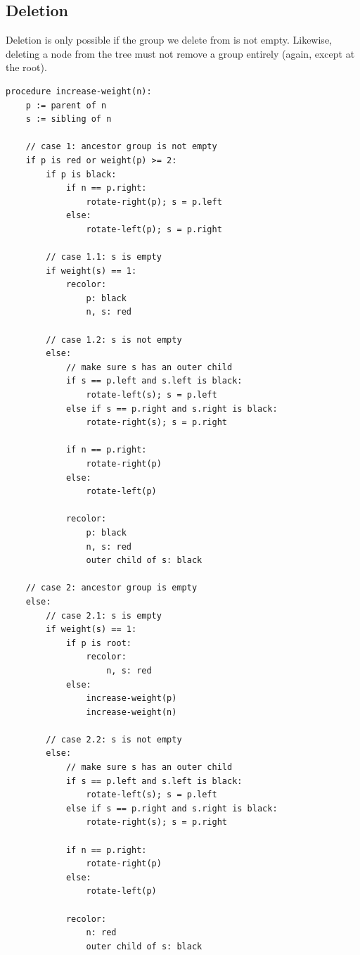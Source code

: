 \documentclass{article}
\begin{document}
\subsection{Deletion}
Deletion is only possible if the group we delete from is not empty. Likewise, deleting a node from the tree must not remove a group entirely
(again, except at the root).

\begin{small}
\begin{verbatim}
procedure increase-weight(n):
    p := parent of n
    s := sibling of n

    // case 1: ancestor group is not empty
    if p is red or weight(p) >= 2:
        if p is black:
            if n == p.right:
                rotate-right(p); s = p.left
            else:
                rotate-left(p); s = p.right

        // case 1.1: s is empty
        if weight(s) == 1:
            recolor:
                p: black
                n, s: red

        // case 1.2: s is not empty
        else:
            // make sure s has an outer child
            if s == p.left and s.left is black:
                rotate-left(s); s = p.left
            else if s == p.right and s.right is black:
                rotate-right(s); s = p.right

            if n == p.right:
                rotate-right(p)
            else:
                rotate-left(p)

            recolor:
                p: black
                n, s: red
                outer child of s: black

    // case 2: ancestor group is empty
    else:
        // case 2.1: s is empty
        if weight(s) == 1:
            if p is root:
                recolor:
                    n, s: red
            else:
                increase-weight(p)
                increase-weight(n)

        // case 2.2: s is not empty
        else:
            // make sure s has an outer child
            if s == p.left and s.left is black:
                rotate-left(s); s = p.left
            else if s == p.right and s.right is black:
                rotate-right(s); s = p.right

            if n == p.right:
                rotate-right(p)
            else:
                rotate-left(p)

            recolor:
                n: red
                outer child of s: black



\end{verbatim}
\end{small}
\end{document}
